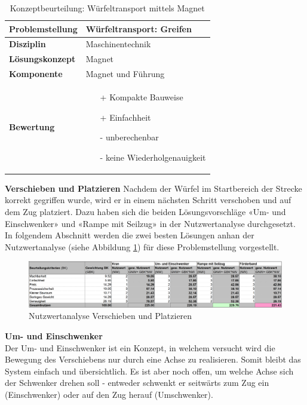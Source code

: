 \documentclass[../../main.tex]{subfiles}
\begin{document}
 \begin{flushleft}
    \begin{table}[h]
    \begin{tabular}{ | l | p{11cm} |}
    \hline
    \textbf{Problemstellung} & Würfeltransport: Greifen \\ \hline
    \textbf{Disziplin} & Maschinentechnik \\ \hline
    \textbf{Lösungskonzept} &  Magnet \\ \hline
    \textbf{Komponente} & Magnet und Führung \\ \hline
    \textbf{Bewertung} &  \begin{itemize}
                            \item[+] Kompakte Bauweise
                            \item[+] Einfachheit
                            \item[-] unberechenbar 
                            \item[-] keine Wiederholgenauigkeit
                          \end{itemize} \\ \hline
    \end{tabular}
    \caption{Konzeptbeurteilung: Würfeltransport mittels Magnet}
    \label{tab:konzept_wurfeltrransport_magnet}
\end{table}
\end{flushleft}
\textbf{Verschieben und Platzieren}
Nachdem der Würfel im Startbereich der Strecke korrekt gegriffen wurde, wird er in einem nächsten Schritt verschoben und auf dem Zug platziert. Dazu haben sich die beiden Lösungsvorschläge «Um- und Einschwenker» und «Rampe mit Seilzug» in der Nutzwertanalyse durchgesetzt. In folgendem Abschnitt werden die zwei besten Lösungen anhan der Nutzwertanalyse (siehe Abbildung \ref{fig:verschieben_platzieren}) für diese Problemstellung vorgestellt.

\begin{figure}[H] %
    \centering
    \includegraphics[width=1\textwidth]{Verschieben_platzieren}
    \caption{Nutzwertanalyse Verschieben und Platzieren}
    \label{fig:verschieben_platzieren}
\end{figure}
\pagebreak
\textbf{Um- und Einschwenker}\\
Der Um- und Einschwenker ist ein Konzept, in welchem versucht wird die Bewegung des Verschiebens nur durch eine Achse zu realisieren. Somit bleibt das System einfach und übersichtlich. Es ist aber noch offen, um welche Achse sich der Schwenker drehen soll - entweder schwenkt er seitwärts zum Zug ein (Einschwenker) oder auf den Zug herauf (Umschwenker).
\end{document}
